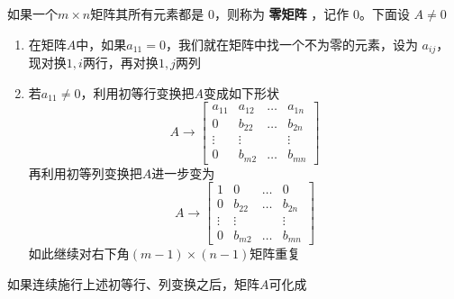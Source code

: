\documentclass[11pt]{article}
\begin{document}
如果一个\(m\times n\)矩阵其所有元素都是 0，则称为 \textbf{零矩阵} ，记作 0。下面设
\(A\neq0\)
\begin{enumerate}
\item 在矩阵\(A\)中，如果\(a_{11}=0\)，我们就在矩阵中找一个不为零的元素，设为
\(a_{ij}\)，现对换\(1,i\)两行，再对换\(1,j\)两列
\item 若\(a_{11}\neq0\)，利用初等行变换把\(A\)变成如下形状
\begin{equation*}
A\to
\begin{bmatrix}
a_{11}&a_{12}&\dots&a_{1n}\\
0&b_{22}&\dots&b_{2n}\\
\vdots&\vdots&&\vdots\\
0&b_{m2}&\dots&b_{mn}
\end{bmatrix}
\end{equation*}
再利用初等列变换把\(A\)进一步变为
\begin{equation*}
A\to
\begin{bmatrix}
1&0&\dots&0\\
0&b_{22}&\dots&b_{2n}\\
\vdots&\vdots&&\vdots\\
0&b_{m2}&\dots&b_{mn}
\end{bmatrix}
\end{equation*}
如此继续对右下角\((m-1)\times(n-1)\)矩阵重复
\end{enumerate}

如果连续施行上述初等行、列变换之后，矩阵\(A\)可化成
\end{document}
